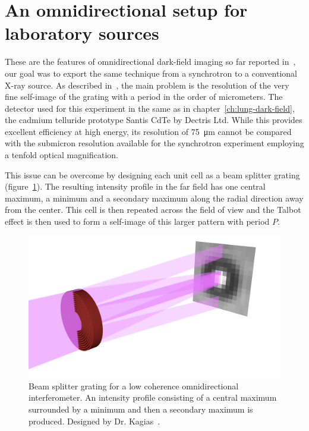 \section{An omnidirectional setup for laboratory sources}
These are the features of omnidirectional dark-field imaging so far reported
in~\parencite{PhysRevLett.116.093902}, our goal was to export the same
technique from a synchrotron to a conventional X-ray source.
As described in~\parencite{kagias2018omnidir}, the main problem is the
resolution of
the very fine self-image of the grating with a period in the order of 
micrometers. The detector used for this experiment in the same as in
chapter~\ref{ch:lung-dark-field}, the cadmium telluride prototype Santis
CdTe by Dectris Ltd. While this provides excellent efficiency at high
energy, its resolution of \SI{75}{\micro\meter} cannot be compared with the
submicron resolution available for the synchrotron experiment employing a tenfold optical magnification.

This issue can be overcome by designing each unit cell as a beam splitter
grating (figure~\ref{fig:beam-splitter}). The resulting intensity profile in the far
field has one central maximum, a minimum and a secondary maximum along the
radial direction away from the center. This cell
is then repeated across the field of view and the Talbot effect is then used
to form a self-image of this larger pattern with period $P$.

\begin{figure}[htb]
    \centering
    \includegraphics[width=\textwidth]{gfx/omnidirectional/unit_cell.png}
    \caption[Beam splitter grating for the omnidirectional
    interferometer.]{Beam splitter grating for a low coherence
        omnidirectional interferometer. An intensity profile consisting of a
        central maximum
surrounded by a minimum and then a secondary maximum is produced. Designed
by Dr. Kagias~\parencite{kagias2018omnidir}.}
    \label{fig:beam-splitter}
\end{figure}

